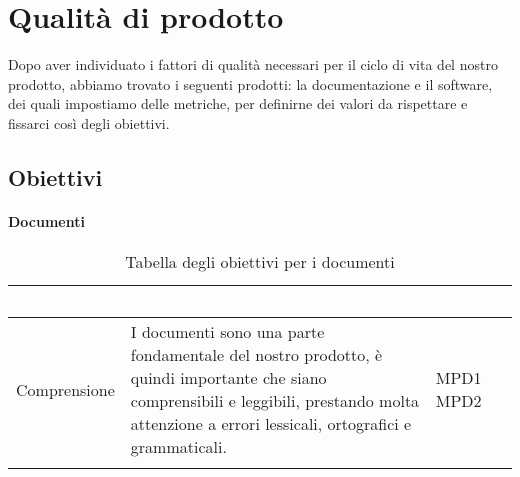 \chapter{Qualità di prodotto}
Dopo aver individuato i fattori di qualità necessari per il ciclo di vita del nostro prodotto, abbiamo trovato i seguenti prodotti: la documentazione
e il software, dei quali impostiamo delle metriche, per definirne dei valori da rispettare e fissarci così degli obiettivi.
\section{Obiettivi}
\subsubsection{Documenti}

\begin{center}
  \renewcommand{\arraystretch}{1.25}
  \begin{longtable}{|p{3cm}|p{7.5cm}|p{2cm}|} \hline
  \rowcolor[HTML]{036400}
  \textcolor{white}{\textbf{Obiettivo}} & \textcolor{white}{\textbf{Descrizione}} & \textcolor{white}{\textbf{Metrica}} \\[0.2em] \hline
  \rowcolor[HTML]{EFEFEF}
    Comprensione & I documenti sono una parte fondamentale del nostro prodotto, è quindi importante che siano comprensibili e leggibili, prestando molta attenzione a errori lessicali, ortografici e grammaticali.  & MPD1 \newline MPD2       \\ \hline
    \caption{Tabella degli obiettivi per i documenti}
  \end{longtable}
\end{center}


